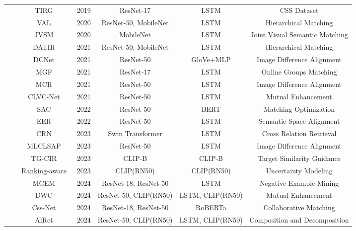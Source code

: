 \begin{table*}
{\begin{tabular}{|c|c|c|c|cc|c|}
 &  & TIRG~\cite{vo2019tirg} & 2019 & ResNet-17 & LSTM & CSS Dataset \\ 
&  & VAL~\cite{chen2020val} & 2020 & ResNet-50, MobileNet & LSTM & Hierarchical Matching\\ 
&  & JVSM~\cite{chen2020jvsm} & 2020 & MobileNet & LSTM & Joint Visual Semantic Matching \\ 
&  & DATIR~\cite{gu2021datir} & 2021 & ResNet-50, MobileNet & LSTM & Hierarchical Matching \\ 
&  & DCNet~\cite{kim2021dcnet} & 2021 & ResNet-50 & GloVe+MLP & Image Difference Alignment \\ 
&  & MGF~\cite{liu2021mgf} & 2021 & ResNet-17 & LSTM & Online Groups Matching \\ 
&  & MCR~\cite{zhang2021mcr} & 2021 & ResNet-50 & LSTM & Image Difference Alignment \\ 
&  & CLVC-Net~\cite{wen2021clvcnet} & 2021 & ResNet-50 & LSTM & Mutual Enhancement \\ 
&  & SAC~\cite{jandial2022sac} & 2022 & ResNet-50 & BERT & Matching Optimization \\ 
&  & EER~\cite{zhang2022eer} & 2022 & ResNet-50 & LSTM & Semantic Space Alignment \\ 
&  & CRN~\cite{yang2023crn} & 2023 & Swin Transformer & LSTM & Cross Relation Retrieval \\ 
&  & MLCLSAP~\cite{zhang2023MLCLSAP} & 2023 & ResNet-50 & LSTM & Image Difference Alignment \\ 
&  & TG-CIR~\cite{wen2023tgcir} & 2023 & CLIP-B & CLIP-B & Target Similarity Guidance \\ 
&  & Ranking-aware~\cite{chen2023ranking} & 2023 & CLIP(RN50) & CLIP(RN50) & Uncertainty Modeling \\ 
&  & MCEM~\cite{zhang2024mcem} & 2024 & ResNet-18, ResNet-50 & LSTM & Negative Example Mining \\ 
&  & DWC~\cite{huang2024dwc} & 2024 & ResNet-50, CLIP(RN50) & LSTM, CLIP(RN50) & Mutual Enhancement \\ 
&  & Css-Net~\cite{zhang2024cssnet} & 2024 & ResNet-18, ResNet-50 & RoBERTa & Collaborative Matching \\ 
&  & AlRet~\cite{xu2024alret} & 2024 & ResNet-50, CLIP(RN50) & LSTM, CLIP(RN50) & Composition and Decomposition \\ 


\end{tabular}}
\end{table*}
